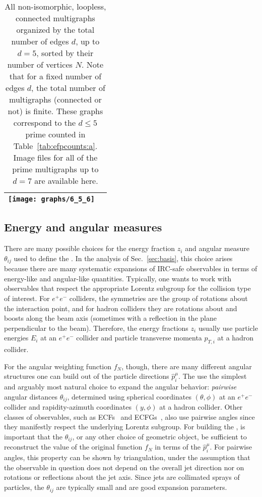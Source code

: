 \documentclass[letterpaper,11pt]{article}
\providecommand{\href}[2]{#2}
\DeclareRobustCommand{\Sec}[1]{Sec.~\ref{#1}}
\DeclareRobustCommand{\Tab}[1]{Table~\ref{#1}}
\newcommand{\B}{\text{EFP}\xspace}
\newcommand{\Bs}{\text{EFPs}\xspace}
\begin{document}
\begin{table}[t]
\begin{tabular}{| >{\centering}m{.5in} | >{\centering}m{5in} |}
                                     \texttt{[image: graphs/6\_5\_6]}
\tabularnewline\hline
\end{tabular}
%
\caption{All non-isomorphic, loopless, connected multigraphs organized by the total number of edges $d$, up to $d=5$, sorted by their number of vertices $N$.  Note that for a fixed number of edges $d$, the total number of multigraphs (connected or not) is finite. These graphs correspond to the $d\le5$ prime \Bs counted in \Tab{tab:efpcounts:a}. Image files for all of the prime \B multigraphs up to $d=7$ are available \href{https://github.com/pkomiske/EnergyFlow/tree/images/graphs}{here}.}
\label{tab:graphs}
\end{table}

\afterpage{\clearpage}


\subsection{Energy and angular measures }
\label{sec:measures}

There are many possible choices for the energy fraction $z_i$ and angular measure $\theta_{ij}$ used to define the \Bs.
%
In the analysis of \Sec{sec:basis}, this choice arises because there are many systematic expansions of IRC-safe observables in terms of energy-like and angular-like quantities.
%
Typically, one wants to work with observables that respect the appropriate Lorentz subgroup for the collision type of interest.
%
For $e^+e^-$ colliders, the symmetries are the group of rotations about the interaction point, and for hadron colliders they are rotations about and boosts along the beam axis (sometimes with a reflection in the plane perpendicular to the beam). 
%
Therefore, the energy fractions $z_i$ usually use particle energies $E_i$ at an $e^+e^-$ collider and particle transverse momenta $p_{T,i}$ at a hadron collider.

For the angular weighting function $f_N$, though, there are many different angular structures one can build out of the particle directions $\hat{p}^\mu_i$.
%
The \Bs use the simplest and arguably most natural choice to expand the angular behavior:  \emph{pairwise} angular distances $\theta_{ij}$,  determined using spherical coordinates $(\theta,\phi)$ at an $e^+e^-$ collider and rapidity-azimuth coordinates $(y,\phi)$ at a hadron collider.
%
Other classes of observables, such as ECFs~\cite{Larkoski:2013eya} and ECFGs~\cite{Moult:2016cvt}, also use pairwise angles since they manifestly respect the underlying Lorentz subgroup.
%
For building the \Bs, is important that the $\theta_{ij}$, or any other choice of geometric object, be sufficient to reconstruct the value of the original function $f_N$ in terms of the $\hat p_i^\mu$.
%
For pairwise angles, this property can be shown by triangulation, under the assumption that the observable in question does not depend on the overall jet direction nor on rotations or reflections about the jet axis.
%
Since jets are collimated sprays of particles, the $\theta_{ij}$ are typically small and are good expansion parameters.
\end{document}
